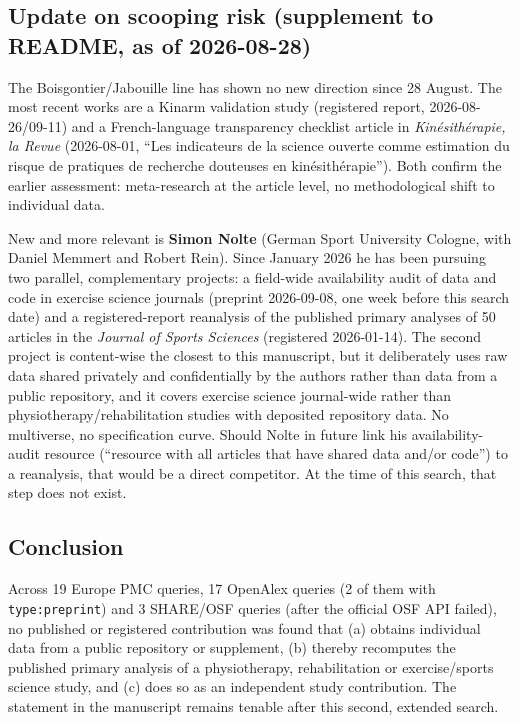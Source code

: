 \subsection{Update on scooping risk (supplement to README, as of 2026-08-28)}\label{update-on-scooping-risk-supplement-to-readme-as-of-2026-08-28}

The Boisgontier/Jabouille line has shown no new direction since 28 August. The most recent works are a Kinarm validation study (registered report, 2026-08-26/09-11) and a French-language transparency checklist article in \emph{Kinésithérapie, la Revue} (2026-08-01, ``Les indicateurs de la science ouverte comme estimation du risque de pratiques de recherche douteuses en kinésithérapie''). Both confirm the earlier assessment: meta-research at the article level, no methodological shift to individual data.

New and more relevant is \textbf{Simon Nolte} (German Sport University Cologne, with Daniel Memmert and Robert Rein). Since January 2026 he has been pursuing two parallel, complementary projects: a field-wide availability audit of data and code in exercise science journals (preprint 2026-09-08, one week before this search date) and a registered-report reanalysis of the published primary analyses of 50 articles in the \emph{Journal of Sports Sciences} (registered 2026-01-14). The second project is content-wise the closest to this manuscript, but it deliberately uses raw data shared privately and confidentially by the authors rather than data from a public repository, and it covers exercise science journal-wide rather than physiotherapy/rehabilitation studies with deposited repository data. No multiverse, no specification curve. Should Nolte in future link his availability-audit resource (``resource with all articles that have shared data and/or code'') to a reanalysis, that would be a direct competitor. At the time of this search, that step does not exist.

\subsection{Conclusion}\label{conclusion}

Across 19 Europe PMC queries, 17 OpenAlex queries (2 of them with \texttt{type:preprint}) and 3 SHARE/OSF queries (after the official OSF API failed), no published or registered contribution was found that (a) obtains individual data from a public repository or supplement, (b) thereby recomputes the published primary analysis of a physiotherapy, rehabilitation or exercise/sports science study, and (c) does so as an independent study contribution. The statement in the manuscript remains tenable after this second, extended search.

